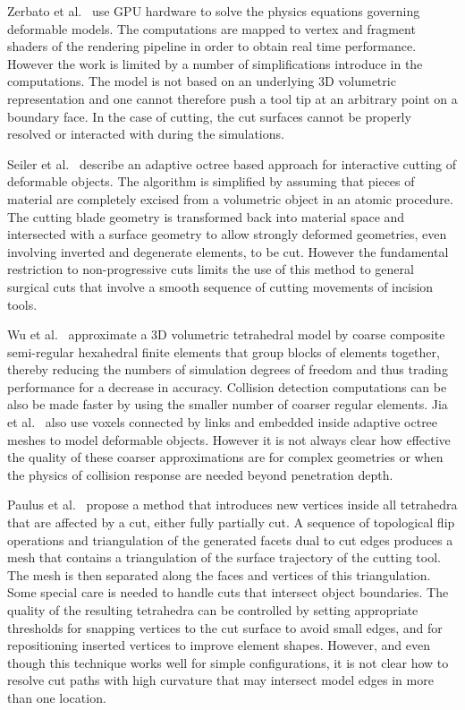 Zerbato et al.~\cite{zerbato:cars:2011} use GPU hardware to solve the physics equations governing deformable models. The computations are mapped to vertex and fragment shaders of the rendering pipeline in order to obtain real time performance. However the work is limited by a number of simplifications introduce in the computations. 
The model is not based on an underlying 3D volumetric representation and one cannot therefore push a tool tip at an arbitrary point on a boundary face. In the case of cutting, the cut surfaces cannot be properly resolved or interacted with during the simulations. 

Seiler et al.~\cite{seiler:tvc:2011} describe an adaptive octree based approach for interactive cutting of deformable objects.
The algorithm is simplified by assuming that pieces of material are completely excised from a volumetric object in an atomic procedure. The cutting blade geometry is transformed back into material space and intersected with a surface geometry to allow strongly deformed geometries, even involving inverted and degenerate elements, to be cut. However the fundamental restriction to non-progressive cuts limits the use of this method to general surgical cuts that involve a smooth sequence of cutting movements of incision tools. 

Wu et al.~\cite{wu:tvc:2013, wu:cgf:2015} approximate a 3D volumetric tetrahedral model by coarse composite semi-regular hexahedral finite elements that group blocks of elements together, thereby reducing the numbers of simulation degrees of freedom and thus trading performance for a decrease in accuracy. Collision detection computations can be also be made faster by using the smaller number of coarser regular elements. Jia et al.~\cite{jia:cst:2017} also use voxels connected by links and embedded inside adaptive octree meshes to model deformable objects. However it is not always clear how effective the quality of these coarser approximations are for complex geometries or when the physics of collision response are needed beyond penetration depth. 

Paulus et al.~\cite{paulus:tvc:2015} propose a method that introduces new vertices inside all tetrahedra that are affected by a cut, either fully partially cut. A sequence of topological flip operations and triangulation of the generated facets dual to cut edges produces a mesh that contains a triangulation of the surface trajectory of the cutting tool. The mesh is then separated along the faces and vertices of this triangulation. Some special care is needed to handle cuts that intersect object boundaries. The quality of the resulting tetrahedra can be controlled by setting appropriate thresholds for snapping vertices to the cut surface to avoid small edges, and for repositioning inserted vertices to improve element shapes. However, and even though this technique works well for simple configurations, it is not clear how to resolve cut paths with high curvature that may intersect  model edges in more than one location.

